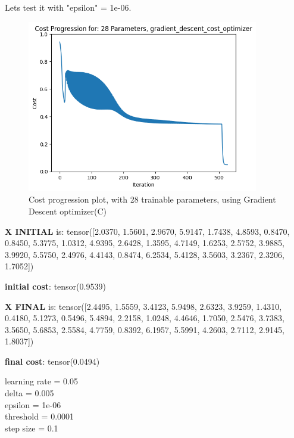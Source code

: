 \documentclass[inscr,ack,preface]{diphdthesis}
\begin{document}
\begin{enumerate}[label=\textbf{\Alph*.}]
    Lets test it with "epsilon" = 1e-06.
    
    \begin{figure}[H]
        \centering
        \includegraphics[width=0.9\textwidth]{epsilon06/28.png}
        \caption{Cost progression plot, with 28 trainable parameters, using Gradient Descent optimizer(C)} 
        \label{fig:fig3}
    \end{figure}
    
    \textbf{X INITIAL}  is:
    tensor([2.0370, 1.5601, 2.9670, 5.9147, 1.7438, 4.8593, 0.8470, 0.8450, 5.3775,
            1.0312, 4.9395, 2.6428, 1.3595, 4.7149, 1.6253, 2.5752, 3.9885, 3.9920,
            5.5750, 2.4976, 4.4143, 0.8474, 6.2534, 5.4128, 3.5603, 3.2367, 2.3206,
            1.7052])
            
    \textbf{initial cost}: tensor(0.9539)
    
    \textbf{X FINAL} is:
    tensor([2.4495, 1.5559, 3.4123, 5.9498, 2.6323, 3.9259, 1.4310, 0.4180, 5.1273,
            0.5496, 5.4894, 2.2158, 1.0248, 4.4646, 1.7050, 2.5476, 3.7383, 3.5650,
            5.6853, 2.5584, 4.7759, 0.8392, 6.1957, 5.5991, 4.2603, 2.7112, 2.9145,
            1.8037])
    
    \textbf{final cost}: tensor(0.0494)
    
    learning rate =  0.05 \\
    delta =  0.005 \\
    epsilon =  1e-06 \\
    threshold =  0.0001 \\
    step size =  0.1 \\
    
\end{enumerate}
\end{document}
